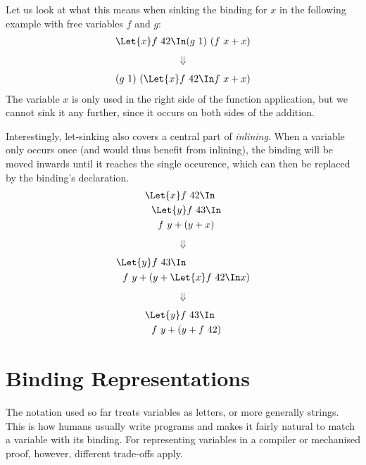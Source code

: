     Let us look at what this means when sinking the binding for $x$
    in the following example with free variables $f$ and $g$:
    \begin{align*}
      \Let{x} f\ 42 \In (g\ 1)\ (f\ x + x)
    \end{align*}
    \begin{align*}
      \Downarrow
    \end{align*}
    \begin{align*}
      (g\ 1)\ (\Let{x} f\ 42 \In f\ x + x)
    \end{align*}
    The variable $x$ is only used in the right side of the function application,
    but we cannot sink it any further,
    since it occurs on both sides of the addition.

    Interestingly, let-sinking also covers a central part of \emph{inlining}.
    When a variable only occurs once (and would thus benefit from inlining),
    the binding will be moved inwards until it reaches the single occurence,
    which can then be replaced by the binding's declaration.
    \begin{align*}
      &\Let{x} f\ 42 \In          \\
      &\ \ \Let{y} f\ 43 \In      \\
      &\ \ \ \ f\ y + (y + x)
    \end{align*}
    \begin{align*}
      \Downarrow
    \end{align*}
    \begin{align*}
      &\Let{y} f\ 43 \In      \\
      &\ \ f\ y + (y + \Let{x} f\ 42 \In x)
    \end{align*}
    \begin{align*}
      \Downarrow
    \end{align*}
    \begin{align*}
      &\Let{y} f\ 43 \In      \\
      &\ \ f\ y + (y + f\ 42)
    \end{align*}

\section{Binding Representations}
\label{sec:binding-representations}
    The notation used so far treats variables as letters, or more generally strings.
    This is how humans usually write programs
    and makes it fairly natural to match a variable with its binding.
    For representing variables in a compiler or mechanised proof, however,
    different trade-offs apply.

